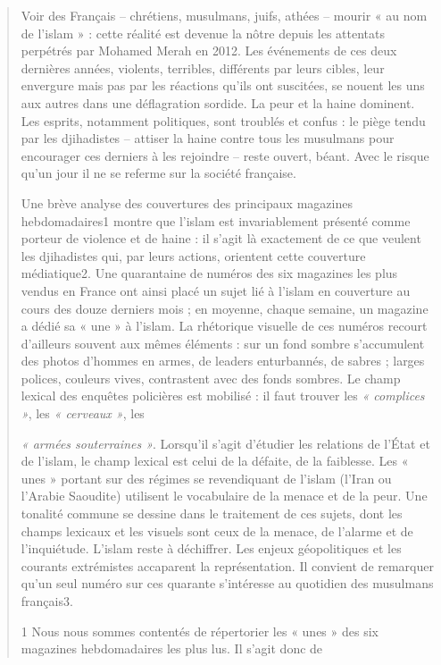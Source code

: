 \begin{quote}
Voir des Français -- chrétiens, musulmans, juifs, athées -- mourir « au
nom de l'islam » : cette réalité est devenue la nôtre depuis les
attentats perpétrés par Mohamed Merah en 2012. Les événements de ces
deux dernières années, violents, terribles, différents par leurs cibles,
leur envergure mais pas par les réactions qu'ils ont suscitées, se
nouent les uns aux autres dans une déflagration sordide. La peur et la
haine dominent. Les esprits, notamment politiques, sont troublés et
confus : le piège tendu par les djihadistes -- attiser la haine contre
tous les musulmans pour encourager ces derniers à les rejoindre -- reste
ouvert, béant. Avec le risque qu'un jour il ne se referme sur la société
française.

Une brève analyse des couvertures des principaux magazines
hebdomadaires1 montre que l'islam est invariablement présenté comme
porteur de violence et de haine : il s'agit là exactement de ce que
veulent les djihadistes qui, par leurs actions, orientent cette
couverture médiatique2. Une quarantaine de numéros des six magazines les
plus vendus en France ont ainsi placé un sujet lié à l'islam en
couverture au cours des douze derniers mois ; en moyenne, chaque
semaine, un magazine a dédié sa « une » à l'islam. La rhétorique
visuelle de ces numéros recourt d'ailleurs souvent aux mêmes éléments :
sur un fond sombre s'accumulent des photos d'hommes en armes, de leaders
enturbannés, de sabres ; larges polices, couleurs vives, contrastent
avec des fonds sombres. Le champ lexical des enquêtes policières est
mobilisé : il faut trouver les \emph{« complices »}, les \emph{«
cerveaux »}, les

\emph{« armées souterraines »}. Lorsqu'il s'agit d'étudier les relations
de l'État et de l'islam, le champ lexical est celui de la défaite, de la
faiblesse. Les « unes » portant sur des régimes se revendiquant de
l'islam (l'Iran ou l'Arabie Saoudite) utilisent le vocabulaire de la
menace et de la peur. Une tonalité commune se dessine dans le traitement
de ces sujets, dont les champs lexicaux et les visuels sont ceux de la
menace, de l'alarme et de l'inquiétude. L'islam reste à déchiffrer. Les
enjeux géopolitiques et les courants extrémistes accaparent la
représentation. Il convient de remarquer qu'un seul numéro sur ces
quarante s'intéresse au quotidien des musulmans français3.

1 Nous nous sommes contentés de répertorier les « unes » des six
magazines hebdomadaires les plus lus. Il s'agit donc de


\end{quote}
